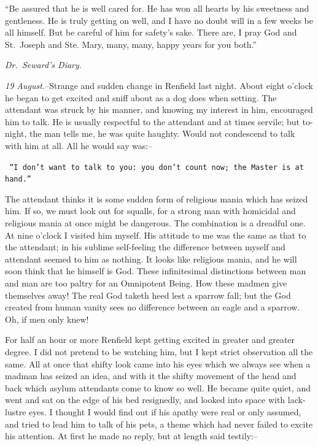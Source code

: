 \documentclass[12pt,openright]{book}
\begin{document}
“Be assured that he is well cared for. He has won all hearts by his sweetness and gentleness. He is truly getting on well, and I have no doubt will in a few weeks be all himself. But be careful of him for safety’s sake. There are, I pray God and St. Joseph and Ste. Mary, many, many, happy years for you both.”

\textit{Dr. Seward’s Diary.}

\textit{19 August.}–Strange and sudden change in Renfield last night. About eight o’clock he began to get excited and sniff about as a dog does when setting. The attendant was struck by his manner, and knowing my interest in him, encouraged him to talk. He is usually respectful to the attendant and at times servile; but to-night, the man tells me, he was quite haughty. Would not condescend to talk with him at all. All he would say was:–

\texttt{ “I don’t want to talk to you: you don’t count now; the Master is at}
\texttt{ hand.”}

The attendant thinks it is some sudden form of religious mania which has seized him. If so, we must look out for squalls, for a strong man with homicidal and religious mania at once might be dangerous. The combination is a dreadful one. At nine o’clock I visited him myself. His attitude to me was the same as that to the attendant; in his sublime self-feeling the difference between myself and attendant seemed to him as nothing. It looks like religious mania, and he will soon think that he himself is God. These infinitesimal distinctions between man and man are too paltry for an Omnipotent Being. How these madmen give themselves away! The real God taketh heed lest a sparrow fall; but the God created from human vanity sees no difference between an eagle and a sparrow. Oh, if men only knew!

For half an hour or more Renfield kept getting excited in greater and greater degree. I did not pretend to be watching him, but I kept strict observation all the same. All at once that shifty look came into his eyes which we always see when a madman has seized an idea, and with it the shifty movement of the head and back which asylum attendants come to know so well. He became quite quiet, and went and sat on the edge of his bed resignedly, and looked into space with lack-lustre eyes. I thought I would find out if his apathy were real or only assumed, and tried to lead him to talk of his pets, a theme which had never failed to excite his attention. At first he made no reply, but at length said testily:–
\end{document}
